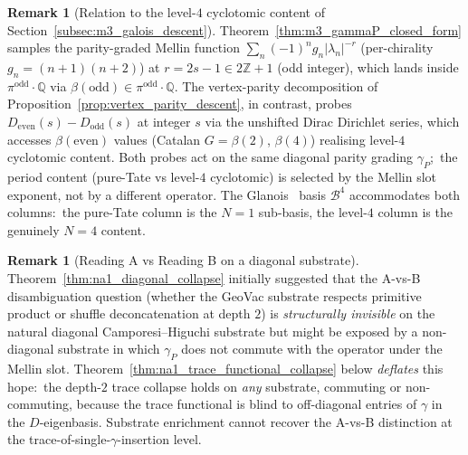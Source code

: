 \documentclass[11pt,a4paper]{article}
\theoremstyle{plain}
\theoremstyle{definition}
\newtheorem{remark}[theorem]{Remark}
\newcommand{\Z}{\mathbb{Z}}
\newcommand{\Q}{\mathbb{Q}}
\newcommand{\Bcal}{\mathcal{B}}
\begin{document}
\begin{remark}[Relation to the level-$4$ cyclotomic content of
Section~\ref{subsec:m3_galois_descent}]
\label{rem:gammaP_vs_vertex_restricted}
Theorem~\ref{thm:m3_gammaP_closed_form} samples the
parity-graded Mellin function
$\sum_n (-1)^n g_n |\lambda_n|^{-r}$ (per-chirality $g_n = (n+1)(n+2)$) at $r = 2s - 1 \in 2\Z + 1$
(odd integer), which lands inside $\pi^{\mathrm{odd}}\cdot\Q$ via
$\beta(\mathrm{odd}) \in \pi^{\mathrm{odd}}\cdot\Q$. The
vertex-parity decomposition of
Proposition~\ref{prop:vertex_parity_descent}, in contrast, probes
$D_{\mathrm{even}}(s) - D_{\mathrm{odd}}(s)$ at integer $s$ via the
unshifted Dirac Dirichlet series, which accesses
$\beta(\mathrm{even})$ values (Catalan $G = \beta(2)$, $\beta(4)$)
realising level-$4$ cyclotomic content.  Both probes act on the
same diagonal parity grading $\gamma_P$;\ the period content (pure-Tate
vs level-$4$ cyclotomic) is selected by the Mellin slot exponent,
not by a different operator.  The Glanois~\cite{glanois2015} basis
$\Bcal^4$ accommodates both columns:\ the pure-Tate column is the
$N = 1$ sub-basis, the level-$4$ column is the genuinely $N = 4$
content.
\end{remark}

\begin{remark}[Reading A vs Reading B on a diagonal substrate]
\label{rem:reading_AB_diagonal_invisible}
Theorem~\ref{thm:na1_diagonal_collapse} initially suggested that the
A-vs-B disambiguation question (whether the GeoVac substrate
respects primitive product or shuffle deconcatenation at depth $2$)
is \emph{structurally invisible} on the natural diagonal
Camporesi--Higuchi substrate but might be exposed by a non-diagonal
substrate in which $\gamma_P$ does not commute with the operator
under the Mellin slot.  Theorem~\ref{thm:na1_trace_functional_collapse}
below \emph{deflates} this hope:\ the depth-$2$ trace collapse holds
on \emph{any} substrate, commuting or non-commuting, because the
trace functional is blind to off-diagonal entries of $\gamma$ in the
$D$-eigenbasis.  Substrate enrichment cannot recover the A-vs-B
distinction at the trace-of-single-$\gamma$-insertion level.
\end{remark}
\end{document}
